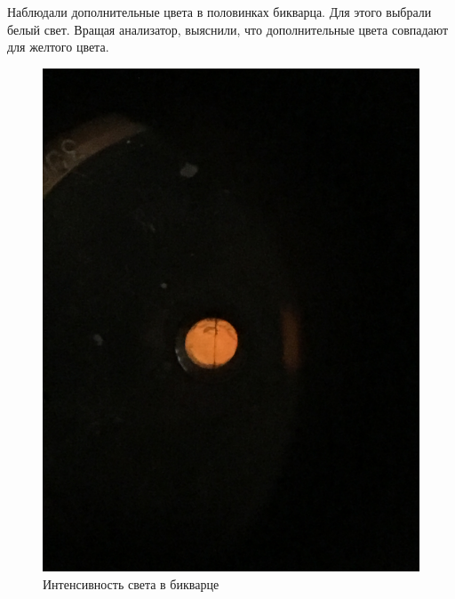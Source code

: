 Наблюдали дополнительные цвета в половинках бикварца. Для этого выбрали белый свет. Вращая анализатор, выяснили, что дополнительные цвета совпадают для желтого цвета. 



\begin{figure}[h!]
	\caption{Интенсивность света в бикварце}
	\centering
	\begin{minipage}{0.25\linewidth}
		\includegraphics[width=\linewidth]{biquarz/yellow-yellow.jpg}

\end{minipage}
\end{figure}
